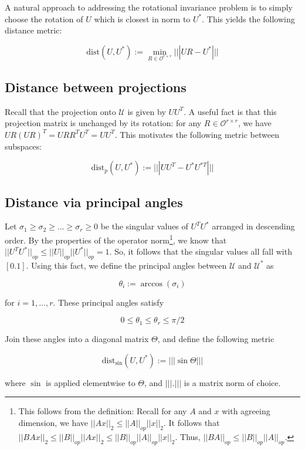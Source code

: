 \documentclass{amsart}
\newcommand{\dist}{\textrm{dist}}
\newcommand{\calU}{\mathcal{U}}
\newcommand{\calO}{\mathcal{O}}
\begin{document}
A natural approach to addressing the rotational invariance problem is to simply choose the rotation of $U$ which is
closest in norm to $U^{*}$. This yields the following distance metric:

$$\dist(U, U^{*}) := \min_{R \in \calO^{r \times r}}|||UR - U^{*}|||$$

\subsection{Distance between projections}

Recall that the projection onto $\calU$ is given by $UU^{T}$. A useful fact is that this projection matrix is unchanged by its rotation: for any $R \in \calO^{r \times r}$, we have $UR(UR)^{T} = URR^{T}U^{T} = UU^{T}$. This motivates the following metric between subspaces:

$$\dist_{p}(U, U^{*}) := |||UU^{T} - U^{*}U^{*T}|||$$

\subsection{Distance via principal angles}

Let $\sigma_{1} \geq \sigma_{2} \geq ... \geq \sigma_{r} \geq 0$ be the singular values of $U^{T}U^{*}$ arranged in descending order. By the properties of the operator norm\footnote{This follows from the definition: Recall for any $A$ and $x$ with agreeing dimension, we have $||Ax||_2 \leq ||A||_{op}||x||_{2}$. It follows that $||BAx||_{2} \leq ||B||_{op}||Ax||_{2} \leq ||B||_{op}||A||_{op}||x||_{2}$. Thus, $||BA||_{op} \leq ||B||_{op}||A||_{op}$.}, we know that $||U^TU^*||_{op} \leq ||U||_{op} ||U^*||_{op} = 1$. So, it follows that the singular values all fall with $[0.1]$. Using this fact, we define the principal angles between $\calU$ and $\calU^{*}$ as

$$\theta_{i} := \arccos(\sigma_{i})$$

for $i = 1, ..., r$. These principal angles satisfy

$$0 \leq \theta_{1} \leq \theta_{r} \leq \pi/2$$

Join these angles into a diagonal matrix $\Theta$, and define the following metric

$$\dist_{\sin}(U, U^{*}) := |||\sin \Theta|||$$

where $\sin$ is applied elementwise to $\Theta$, and $|||.|||$ is a matrix norm of choice.

\bigskip
\end{document}
